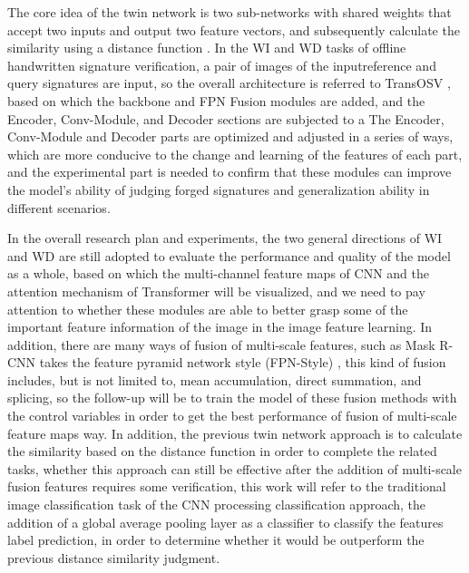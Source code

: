 The core idea of the twin network is two sub-networks with shared weights that accept two inputs and output two feature vectors, and subsequently calculate the similarity using a distance function \cite{10}. In the WI and WD tasks of offline handwritten signature verification, a pair of images of the inputreference and query signatures are input, so the overall architecture is referred to TransOSV \cite{41}, based on which the backbone and FPN Fusion modules are added, and the Encoder, Conv-Module, and Decoder sections are subjected to a The Encoder, Conv-Module and Decoder parts are optimized and adjusted in a series of ways, which are more conducive to the change and learning of the features of each part, and the experimental part is needed to confirm that these modules can improve the model's ability of judging forged signatures and generalization ability in different scenarios.

In the overall research plan and experiments, the two general directions of WI and WD are still adopted to evaluate the performance and quality of the model as a whole, based on which the multi-channel feature maps of CNN and the attention mechanism of Transformer will be visualized, and we need to pay attention to whether these modules are able to better grasp some of the important feature information of the image in the image feature learning. In addition, there are many ways of fusion of multi-scale features, such as Mask R-CNN \cite{13} takes the feature pyramid network style (FPN-Style) \cite{23}, this kind of fusion includes, but is not limited to, mean accumulation, direct summation, and splicing, so the follow-up will be to train the model of these fusion methods with the control variables in order to get the best performance of fusion of multi-scale feature maps way. In addition, the previous twin network approach is to calculate the similarity based on the distance function in order to complete the related tasks, whether this approach can still be effective after the addition of multi-scale fusion features requires some verification, this work will refer to the traditional image classification task of the CNN processing classification approach, the addition of a global average pooling layer as a classifier to classify the features label prediction, in order to determine whether it would be outperform the previous distance similarity judgment.

